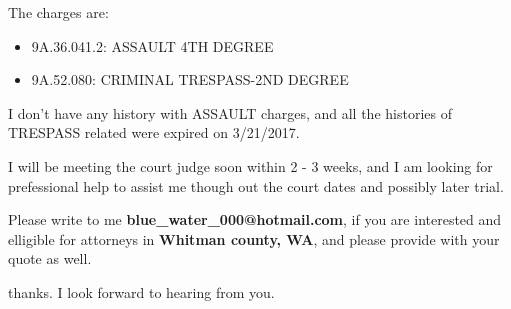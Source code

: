 \documentclass[9pt, b5paaper]{book}
\begin{document}
The charges are: 
\begin{itemize}
\item 9A.36.041.2: ASSAULT 4TH DEGREE
\item 9A.52.080: CRIMINAL TRESPASS-2ND DEGREE
\end{itemize}

I don't have any history with ASSAULT charges, and all the histories
of TRESPASS related were expired on 3/21/2017. 

I will be meeting the court judge soon within 2 - 3 weeks, and I am
looking for prefessional help to assist me though out the court dates and possibly
later trial. 

Please write to me \textbf{blue\_water\_000@hotmail.com}, if you are interested
and elligible for attorneys in \textbf{Whitman county, WA}, and please provide with your
quote as well. 

thanks. I look forward to hearing from you. 
\end{document}
